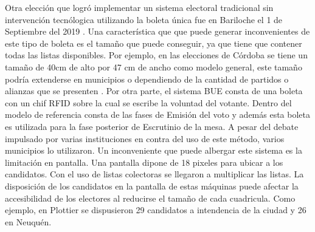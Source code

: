 Otra elección que logró implementar un sistema electoral tradicional sin intervención tecnólogica utilizando la boleta única fue en Bariloche el 1 de Septiembre del 2019 \cite{anbariloche,rnbariloche}. Una característica que que puede generar inconvenientes de este tipo de boleta es el tamaño que puede conseguir, ya que tiene que contener todas las listas disponibles. Por ejemplo, en las elecciones de Córdoba se tiene un tamaño de 40cm de alto por 47 cm de ancho como modelo general, este tamaño podría extenderse en municipios o dependiendo de la cantidad de partidos o alianzas que se presenten \cite{boletaUnicaTamanio}. \newline
Por otra parte, el sistema BUE consta de una boleta con un chif RFID sobre la cual se escribe la voluntad del votante. Dentro del modelo de referencia consta de las fases de Emisión del voto y además esta boleta es utilizada para la fase posterior de Escrutinio de la mesa. A pesar del debate impulsado por varias instituciones en contra del uso de este método, varios municipios lo utilizaron. Un inconveniente que puede albergar este sistema es la limitación en pantalla. Una pantalla dipone de 18 pixeles para ubicar a los candidatos. Con el uso de listas colectoras se llegaron a multiplicar las listas. La disposición de los candidatos en la pantalla de estas máquinas puede afectar la accesibilidad de los electores al reducirse el tamaño de cada cuadricula. Como ejemplo, en Plottier \cite{lmncolectoras} se dispusieron 29 candidatos a intendencia de la ciudad y 26 en Neuquén. 

